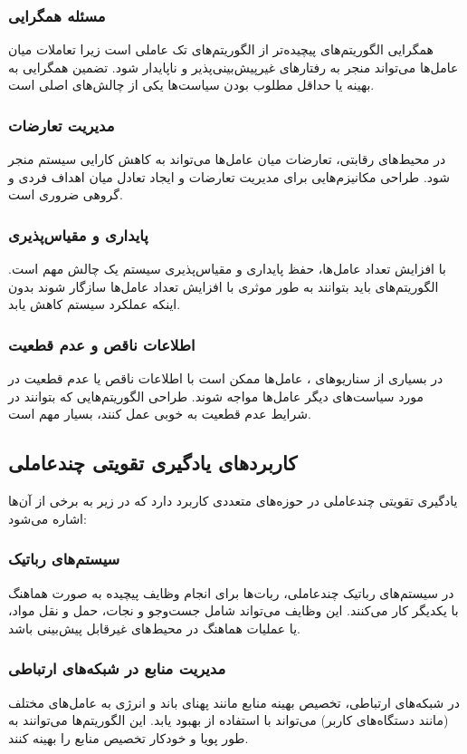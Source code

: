 \subsubsection{مسئله همگرایی}
همگرایی الگوریتم‌های  پیچیده‌تر از الگوریتم‌های تک عاملی است زیرا تعاملات میان عامل‌ها می‌تواند منجر به رفتارهای غیرپیش‌بینی‌پذیر و ناپایدار شود. تضمین همگرایی به بهینه یا حداقل مطلوب بودن سیاست‌ها یکی از چالش‌های اصلی است.

\subsubsection{مدیریت تعارضات}
در محیط‌های رقابتی، تعارضات میان عامل‌ها می‌تواند به کاهش کارایی سیستم منجر شود. طراحی مکانیزم‌هایی برای مدیریت تعارضات و ایجاد تعادل میان اهداف فردی و گروهی ضروری است.

\subsubsection{پایداری و مقیاس‌پذیری}
با افزایش تعداد عامل‌ها، حفظ پایداری و مقیاس‌پذیری سیستم یک چالش مهم است. الگوریتم‌های  باید بتوانند به طور موثری با افزایش تعداد عامل‌ها سازگار شوند بدون اینکه عملکرد سیستم کاهش یابد.

\subsubsection{اطلاعات ناقص و عدم قطعیت}
در بسیاری از سناریوهای ، عامل‌ها ممکن است با اطلاعات ناقص یا عدم قطعیت در مورد سیاست‌های دیگر عامل‌ها مواجه شوند. طراحی الگوریتم‌هایی که بتوانند در شرایط عدم قطعیت به خوبی عمل کنند، بسیار مهم است.

\subsection{کاربردهای یادگیری تقویتی چندعاملی}
یادگیری تقویتی چندعاملی در حوزه‌های متعددی کاربرد دارد که در زیر به برخی از آن‌ها اشاره می‌شود:

\subsubsection{سیستم‌های رباتیک}
در سیستم‌های رباتیک چندعاملی، ربات‌ها برای انجام وظایف پیچیده به صورت هماهنگ با یکدیگر کار می‌کنند. این وظایف می‌تواند شامل جست‌وجو و نجات، حمل و نقل مواد، یا عملیات هماهنگ در محیط‌های غیرقابل پیش‌بینی باشد.

\subsubsection{مدیریت منابع در شبکه‌های ارتباطی}
در شبکه‌های ارتباطی، تخصیص بهینه منابع مانند پهنای باند و انرژی به عامل‌های مختلف (مانند دستگاه‌های کاربر) می‌تواند با استفاده از  بهبود یابد. این الگوریتم‌ها می‌توانند به طور پویا و خودکار تخصیص منابع را بهینه کنند.

